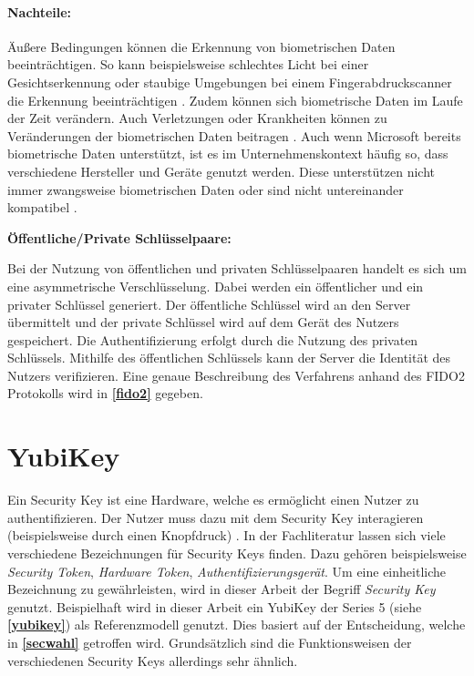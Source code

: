 \paragraph*{Nachteile:} Äußere Bedingungen können die Erkennung von biometrischen Daten beeinträchtigen. So kann beispielsweise schlechtes Licht bei einer Gesichtserkennung oder staubige Umgebungen bei einem Fingerabdruckscanner die Erkennung beeinträchtigen \cite{parmar2022comprehensive}. Zudem können sich biometrische Daten im Laufe der Zeit verändern. Auch Verletzungen oder Krankheiten können zu Veränderungen der biometrischen Daten beitragen \cite{boonkrong2012security}. Auch wenn Microsoft bereits biometrische Daten unterstützt, ist es im Unternehmenskontext häufig so, dass verschiedene Hersteller und Geräte genutzt werden. Diese unterstützen nicht immer zwangsweise biometrischen Daten oder sind nicht untereinander kompatibel \cite{parmar2022comprehensive}.

\textbf{Öffentliche/Private Schlüsselpaare:}

Bei der Nutzung von öffentlichen und privaten Schlüsselpaaren handelt es sich um eine asymmetrische Verschlüsselung. Dabei werden ein öffentlicher und ein privater Schlüssel generiert. Der öffentliche Schlüssel wird an den Server übermittelt und der private Schlüssel wird auf dem Gerät des Nutzers gespeichert. Die Authentifizierung erfolgt durch die Nutzung des privaten Schlüssels. Mithilfe des öffentlichen Schlüssels kann der Server die Identität des Nutzers verifizieren. Eine genaue Beschreibung des Verfahrens anhand des \ac{FIDO}2 Protokolls wird in \textbf{\ref{fido2}} gegeben.


\section{YubiKey} \label{Yubikey}
Ein Security Key ist eine Hardware, welche es ermöglicht einen Nutzer zu authentifizieren. Der Nutzer muss dazu mit dem Security Key interagieren (beispielsweise durch einen Knopfdruck) \cite{reynolds2018tale}. In der Fachliteratur lassen sich viele verschiedene Bezeichnungen für Security Keys finden. Dazu gehören beispielsweise \textit{Security Token}, \textit{Hardware Token}, \textit{Authentifizierungsgerät}. Um eine einheitliche Bezeichnung zu gewährleisten, wird in dieser Arbeit der Begriff \textit{Security Key} genutzt. Beispielhaft wird in dieser Arbeit ein YubiKey der Series 5 (siehe \textbf{\ref{yubikey}}) als Referenzmodell genutzt. Dies basiert auf der Entscheidung, welche in \textbf{\ref{secwahl}} getroffen wird. Grundsätzlich sind die Funktionsweisen der verschiedenen Security Keys allerdings sehr ähnlich.

